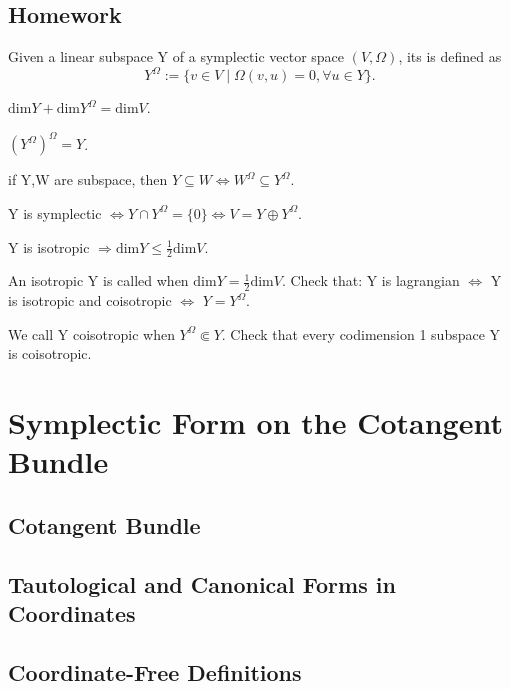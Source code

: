 \documentclass[4paper]{article}
\begin{document}
\subsection{Homework}
Given a linear subspace Y of a symplectic vector space $(V,\Omega)$, its  is 
defined as $$Y^\Omega:=\{v\in V\mid\Omega(v,u)=0, \forall u\in Y\}.$$
\begin{exer}
$\mathrm{dim}Y+\mathrm{dim}Y^\Omega=\mathrm{dim}V$.
\end{exer}
\begin{exer}
$(Y^\Omega)^\Omega=Y$.
\end{exer}
\begin{exer}
if Y,W are subspace, then $Y\subseteq W\Leftrightarrow W^\Omega \subseteq Y^\Omega$.
\end{exer}
\begin{exer}
Y is symplectic $\Leftrightarrow Y\cap Y^\Omega=\{0\} \Leftrightarrow V=Y\oplus Y^\Omega$.
\end{exer}
\begin{exer}
Y is isotropic $\Rightarrow \mathrm{dim}Y\leq \frac{1}{2}\mathrm{dim}V$.
\end{exer}
\begin{exer}
An isotropic Y is called  when $\mathrm{dim}Y= \frac{1}{2}\mathrm{dim}V$. Check that: Y is
lagrangian $\Leftrightarrow$ Y is isotropic and coisotropic $\Leftrightarrow$ $Y=Y^\Omega$. 
\end{exer}
\begin{exer}
We call Y coisotropic when $Y^\Omega\Subset Y$. Check that every codimension 1 subspace Y is coisotropic.
\end{exer}
\section{Symplectic Form on the Cotangent Bundle}

\subsection{Cotangent Bundle}

\subsection{Tautological and Canonical Forms in Coordinates}

\subsection{Coordinate-Free Definitions}
\end{document}
